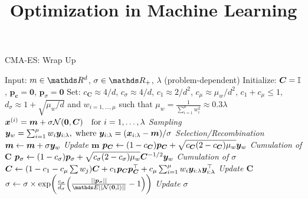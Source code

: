 \documentclass[11pt,compress,t,notes=noshow, xcolor=table]{beamer}
\title{Optimization in Machine Learning}
\begin{document}


\begin{framev}{CMA-ES: Wrap Up}
\begin{algorithm}[H]
\footnotesize
\begin{center}
\caption{CMA-ES}
\begin{algorithmic}[1]
\State Input: $m \in \R^{d}$, $\sigma \in \R_+$, $\lambda$ (problem-dependent)
\State Initialize: $\bm{C} = \bm{\mathbb{I}}$, $\bm{p}_{\bm{c}} = \bm{0}$, $\bm{p}_{\sigma} = \bm{0}$
\State Set: $c_{\bm{C}} \approx 4/d$, $c_{\sigma} \approx 4/d$, $c_1 \approx 2/d^2$, $c_{\mu} \approx \mu_w/d^2$, $c_1+c_{\mu} \leq 1$, $d_{\sigma} \approx 1+\sqrt{\mu_w/d}$ and $w_{i=1,\dots, \mu}$ such that $\mu_w = \frac{1}{\sum_{i=1}^{\mu} w_i^2} \approx 0.3 \lambda$
\State $\bm{x}^{(i)} = \bm{m} + \sigma \mathcal{N}(\bm{0}, \bm{C}) \quad \text{for } i=1,\dots, \lambda$ \quad \hfill \textit{Sampling}
\State $\bm{y}_w = \sum_{i=1}^{\mu} w_i \bm{y}_{i:\lambda},\;\text{where }\bm{y}_{i:\lambda}=(\bm{x}_{i:\lambda}-\bm{m})/\sigma$ \quad \hfill \textit{Selection/Recombination}
\State $\bm{m} \leftarrow \bm{m} + \sigma \bm{y}_w$ \quad \hfill \textit{Update $\bm{m}$}
\State $\bm{p}_{\bm{C}} \leftarrow (1-c_{\bm{C}})\bm{p}_{\bm{C}} + \sqrt{c_{\bm{C}}(2-c_{\bm{C}})\mu_w}\bm{y}_w$ \quad \hfill \textit{Cumulation of $\bm{C}$}
\State $\bm{p}_{\sigma} \leftarrow (1-c_{\sigma})\bm{p}_{\sigma} + \sqrt{c_{\sigma}(2-c_{\sigma})\mu_w} \bm{C}^{-1/2} \bm{y}_w$ \quad \hfill \textit{Cumulation of $\sigma$}
\State $\bm{C} \leftarrow (1-c_1-c_{\mu}\sum w_j) \bm{C} + c_1 \bm{p}_{\bm{C}} \bm{p}_{\bm{C}}^\top + c_{\mu} \sum_{i=1}^{\mu} w_i \bm{y}_{i:\lambda} \bm{y}_{i:\lambda}^\top$ \quad \hfill \textit{Update $\bm{C}$}
\State $\sigma \leftarrow \sigma \times \exp\biggl( \frac{c_\sigma}{d_\sigma}\Bigl(\frac{||\bm{p}_\sigma||}{\E||\normal(\bm{0}, \bm{\I})||} - 1 \Bigl)\biggl)$ \quad \hfill \textit{Update $\sigma$}
\EndWhile
\end{algorithmic}
\end{center}
\end{algorithm}
\end{framev}
\end{document}
